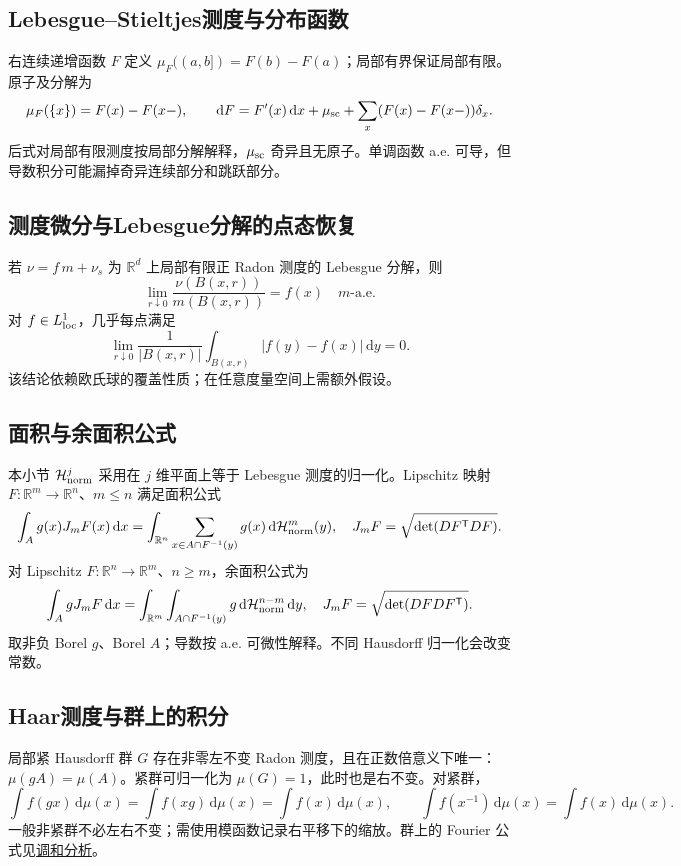 \documentclass[../main.tex]{subfiles}
\begin{document}
\subsection{Lebesgue--Stieltjes测度与分布函数}
右连续递增函数 $F$ 定义 $\mu_F((a,b])=F(b)-F(a)$；局部有界保证局部有限。原子及分解为
\[
\mu_F(\{x\})=F(x)-F(x-),\qquad
\mathrm dF=F'(x)\,\mathrm dx+\mu_{\rm sc}+\sum_x(F(x)-F(x-))\delta_x.
\]
后式对局部有限测度按局部分解解释，$\mu_{\rm sc}$ 奇异且无原子。单调函数 a.e. 可导，但导数积分可能漏掉奇异连续部分和跳跃部分。
\subsection{测度微分与Lebesgue分解的点态恢复}
若 $\nu=f\,m+\nu_s$ 为 $\mathbb R^d$ 上局部有限正 Radon 测度的 Lebesgue 分解，则
\[
\lim_{r\downarrow0}\frac{\nu(B(x,r))}{m(B(x,r))}=f(x)\quad m\text{-a.e.}
\]
对 $f\in L^1_{\rm loc}$，几乎每点满足
\[
\lim_{r\downarrow0}\frac1{|B(x,r)|}\int_{B(x,r)}|f(y)-f(x)|\,\mathrm dy=0.
\]
该结论依赖欧氏球的覆盖性质；在任意度量空间上需额外假设。
\subsection{面积与余面积公式}
本小节 $\mathcal H^j_{\rm norm}$ 采用在 $j$ 维平面上等于 Lebesgue 测度的归一化。Lipschitz 映射 $F:\mathbb R^m\to\mathbb R^n$、$m\le n$ 满足面积公式
\[
\int_Ag(x)J_mF(x)\,\mathrm dx
=\int_{\mathbb R^n}\sum_{x\in A\cap F^{-1}(y)}g(x)\,\mathrm d\mathcal H^m_{\rm norm}(y),
\quad J_mF=\sqrt{\det(DF^{\mathsf T}DF)}.
\]
对 Lipschitz $F:\mathbb R^n\to\mathbb R^m$、$n\ge m$，余面积公式为
\[
\int_AgJ_mF\,\mathrm dx
=\int_{\mathbb R^m}\int_{A\cap F^{-1}(y)}g\,\mathrm d\mathcal H^{n-m}_{\rm norm}\,\mathrm dy,
\quad J_mF=\sqrt{\det(DFDF^{\mathsf T})}.
\]
取非负 Borel $g$、Borel $A$；导数按 a.e. 可微性解释。不同 Hausdorff 归一化会改变常数。
\subsection{Haar测度与群上的积分}
局部紧 Hausdorff 群 $G$ 存在非零左不变 Radon 测度，且在正数倍意义下唯一：$\mu(gA)=\mu(A)$。紧群可归一化为 $\mu(G)=1$，此时也是右不变。对紧群，
\[
\int f(gx)\,\mathrm d\mu(x)=\int f(xg)\,\mathrm d\mu(x)=\int f(x)\,\mathrm d\mu(x),\qquad
\int f(x^{-1})\,\mathrm d\mu(x)=\int f(x)\,\mathrm d\mu(x).
\]
一般非紧群不必左右不变；需使用模函数记录右平移下的缩放。群上的 Fourier 公式见\hyperref[chap:harmonic-analysis]{调和分析}。
\end{document}
